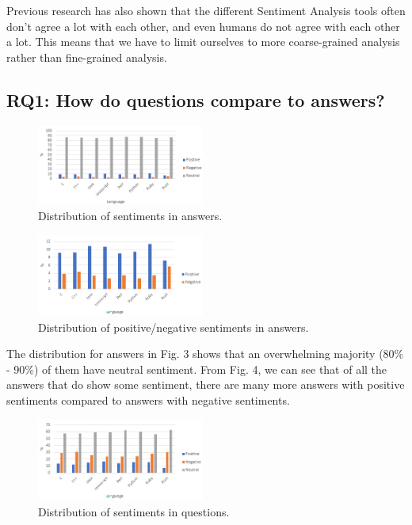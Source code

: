 \documentclass[conference]{IEEEtran}
\begin{document}
Previous research has also shown that the different Sentiment Analysis tools often don't agree a lot with each other, and even humans do not agree with each other a lot. This means that we have to limit ourselves to more coarse-grained analysis rather than fine-grained analysis\cite{b26, b35, b36}. \\

\subsection{RQ1: How do questions compare to answers?}

\begin{figure}[htbp]
\centerline{\includegraphics[width=0.49\textwidth]{figures/summNeutralA.png}}
\caption{Distribution of sentiments in answers.}
\label{fig}
\end{figure}

\begin{figure}[htbp]
\centerline{\includegraphics[width=0.49\textwidth]{figures/summA.png}}
\caption{Distribution of positive/negative sentiments in answers.}
\label{fig}
\end{figure}

The distribution for answers in Fig. 3 shows that an overwhelming majority (80\% - 90\%) of them have neutral sentiment. From Fig. 4, we can see that of all the answers that do show some sentiment, there are many more answers with positive sentiments compared to answers with negative sentiments.\\

\begin{figure}[htbp]
\centerline{\includegraphics[width=0.49\textwidth]{figures/summNeutralQ.png}}
\caption{Distribution of sentiments in questions.}
\label{fig}
\end{figure}
\end{document}
